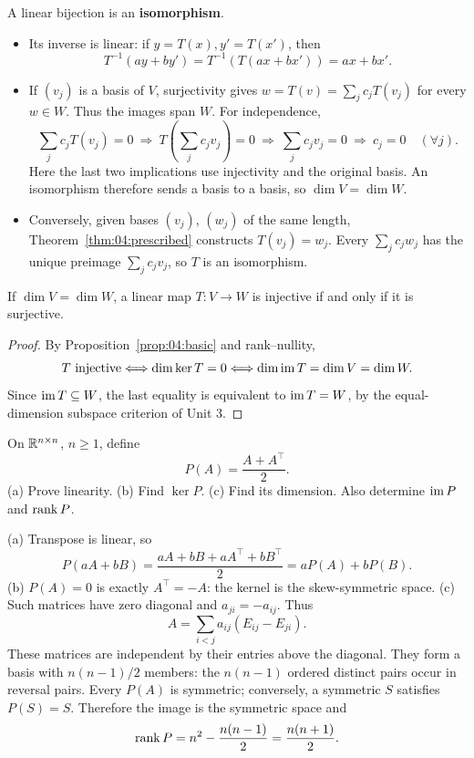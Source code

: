 A linear bijection is an \textbf{isomorphism}.
\begin{itemize}
\item Its inverse is linear: if \(y=T(x),y'=T(x')\), then
\[
T^{-1}(ay+by')=T^{-1}(T(ax+bx'))=ax+bx'.
\]
\item If \((v_j)\) is a basis of \(V\), surjectivity gives
\(w=T(v)=\sum_jc_jT(v_j)\) for every \(w\in W\). Thus the images span \(W\).
For independence,
\[
\sum_jc_jT(v_j)=0
\ \Longrightarrow\ T\left(\sum_jc_jv_j\right)=0
\ \Longrightarrow\ \sum_jc_jv_j=0
\ \Longrightarrow\ c_j=0\quad(\forall j).
\]
Here the last two implications use injectivity and the original basis.
An isomorphism therefore sends a basis to a basis, so \(\dim V=\dim W\).
\item Conversely, given bases \((v_j)\), \((w_j)\) of the same length,
Theorem~\ref{thm:04:prescribed} constructs \(T(v_j)=w_j\).
Every \(\sum_jc_jw_j\) has the unique preimage \(\sum_jc_jv_j\),
so \(T\) is an isomorphism.
\end{itemize}

\begin{proposition}\label{prop:04:equal-dim}
If \(\dim V=\dim W\), a linear map \(T:V\to W\) is injective
if and only if it is surjective.
\end{proposition}
\begin{proof}
By Proposition~\ref{prop:04:basic} and rank--nullity,
\[
T\text{ injective}
\Longleftrightarrow\dim\ker T=0
\Longleftrightarrow\dim\operatorname{im} T=\dim V=\dim W.
\]
Since \(\operatorname{im} T\subseteq W\), the last equality is equivalent to
\(\operatorname{im} T=W\), by the equal-dimension subspace criterion of Unit 3.
\end{proof}

\begin{example}[Symmetrization]\label{example:04:symmetrization}
On \(\mathbb R^{n\times n}\), \(n\geqslant1\), define
\[
P(A)=\frac{A+A^\top}{2}.
\]
(a) Prove linearity. (b) Find \(\ker P\). (c) Find its dimension.
Also determine \(\operatorname{im} P\) and \(\operatorname{rank} P\).
\par\smallskip
{}
(a) Transpose is linear, so
\[
P(aA+bB)=\frac{aA+bB+aA^\top+bB^\top}{2}=aP(A)+bP(B).
\]
(b) \(P(A)=0\) is exactly \(A^\top=-A\): the kernel is the skew-symmetric space.
(c) Such matrices have zero diagonal and \(a_{ji}=-a_{ij}\). Thus
\[
A=\sum_{i<j}a_{ij}(E_{ij}-E_{ji}).
\]
These matrices are independent by their entries above the diagonal.
They form a basis with \(n(n-1)/2\) members: the \(n(n-1)\) ordered
distinct pairs occur in reversal pairs.
Every \(P(A)\) is symmetric; conversely, a symmetric \(S\) satisfies
\(P(S)=S\). Therefore the image is the symmetric space and
\[
\operatorname{rank} P=n^2-\frac{n(n-1)}2=\frac{n(n+1)}2.
\]
\end{example}

